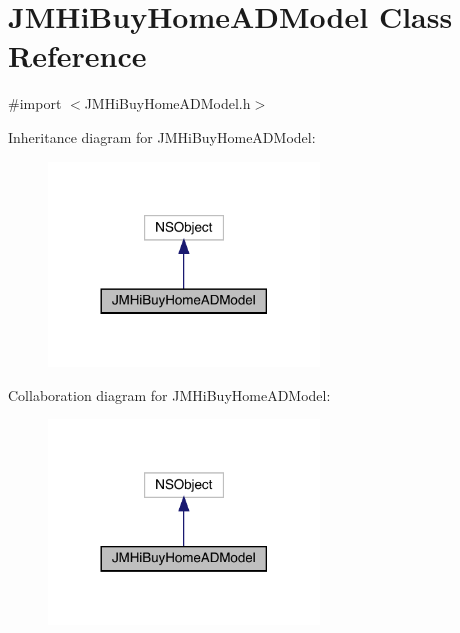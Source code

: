 \hypertarget{interface_j_m_hi_buy_home_a_d_model}{}\section{J\+M\+Hi\+Buy\+Home\+A\+D\+Model Class Reference}
\label{interface_j_m_hi_buy_home_a_d_model}


{\ttfamily \#import $<$J\+M\+Hi\+Buy\+Home\+A\+D\+Model.\+h$>$}



Inheritance diagram for J\+M\+Hi\+Buy\+Home\+A\+D\+Model\+:\nopagebreak
\begin{figure}[H]
\begin{center}
\leavevmode
\includegraphics[width=204pt]{interface_j_m_hi_buy_home_a_d_model__inherit__graph}
\end{center}
\end{figure}


Collaboration diagram for J\+M\+Hi\+Buy\+Home\+A\+D\+Model\+:\nopagebreak
\begin{figure}[H]
\begin{center}
\leavevmode
\includegraphics[width=204pt]{interface_j_m_hi_buy_home_a_d_model__coll__graph}
\end{center}
\end{figure}
